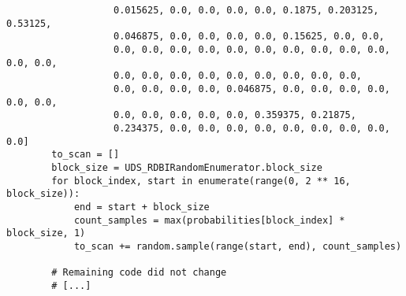 \begin{verbatim}
                   0.015625, 0.0, 0.0, 0.0, 0.0, 0.1875, 0.203125, 0.53125,
                   0.046875, 0.0, 0.0, 0.0, 0.0, 0.15625, 0.0, 0.0,
                   0.0, 0.0, 0.0, 0.0, 0.0, 0.0, 0.0, 0.0, 0.0, 0.0, 0.0, 0.0,
                   0.0, 0.0, 0.0, 0.0, 0.0, 0.0, 0.0, 0.0, 0.0,
                   0.0, 0.0, 0.0, 0.0, 0.046875, 0.0, 0.0, 0.0, 0.0, 0.0, 0.0,
                   0.0, 0.0, 0.0, 0.0, 0.0, 0.359375, 0.21875,
                   0.234375, 0.0, 0.0, 0.0, 0.0, 0.0, 0.0, 0.0, 0.0, 0.0]
        to_scan = []
        block_size = UDS_RDBIRandomEnumerator.block_size
        for block_index, start in enumerate(range(0, 2 ** 16, block_size)):
            end = start + block_size
            count_samples = max(probabilities[block_index] * block_size, 1)
            to_scan += random.sample(range(start, end), count_samples)

        # Remaining code did not change
        # [...]
\end{verbatim}
